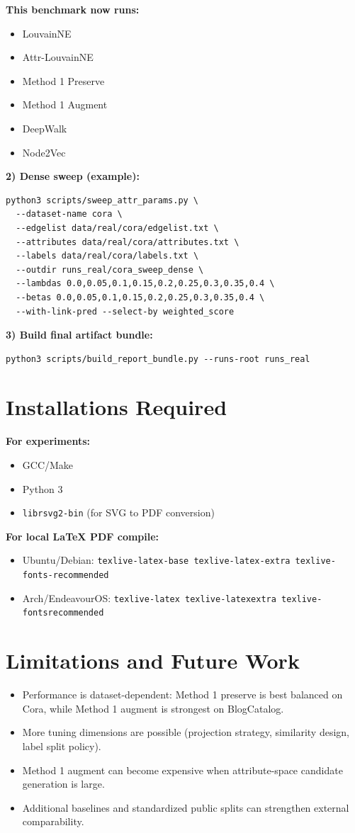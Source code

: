 \documentclass[10pt,twoside,twocolumn]{article}
\begin{document}
\textbf{This benchmark now runs:}
\begin{itemize}
  \item LouvainNE
  \item Attr-LouvainNE
  \item Method 1 Preserve
  \item Method 1 Augment
  \item DeepWalk
  \item Node2Vec
\end{itemize}

\textbf{2) Dense sweep (example):}
\begin{verbatim}
python3 scripts/sweep_attr_params.py \
  --dataset-name cora \
  --edgelist data/real/cora/edgelist.txt \
  --attributes data/real/cora/attributes.txt \
  --labels data/real/cora/labels.txt \
  --outdir runs_real/cora_sweep_dense \
  --lambdas 0.0,0.05,0.1,0.15,0.2,0.25,0.3,0.35,0.4 \
  --betas 0.0,0.05,0.1,0.15,0.2,0.25,0.3,0.35,0.4 \
  --with-link-pred --select-by weighted_score
\end{verbatim}

\textbf{3) Build final artifact bundle:}
\begin{verbatim}
python3 scripts/build_report_bundle.py --runs-root runs_real
\end{verbatim}

\section{Installations Required}
\textbf{For experiments:}
\begin{itemize}
  \item GCC/Make
  \item Python 3
  \item \texttt{librsvg2-bin} (for SVG to PDF conversion)
\end{itemize}

\textbf{For local LaTeX PDF compile:}
\begin{itemize}
  \item Ubuntu/Debian: \texttt{texlive-latex-base texlive-latex-extra texlive-fonts-recommended}
  \item Arch/EndeavourOS: \texttt{texlive-latex texlive-latexextra texlive-fontsrecommended}
\end{itemize}

\section{Limitations and Future Work}
\begin{itemize}
  \item Performance is dataset-dependent: Method 1 preserve is best balanced on Cora, while Method 1 augment is strongest on BlogCatalog.
  \item More tuning dimensions are possible (projection strategy, similarity design, label split policy).
  \item Method 1 augment can become expensive when attribute-space candidate generation is large.
  \item Additional baselines and standardized public splits can strengthen external comparability.
\end{itemize}
\end{document}
